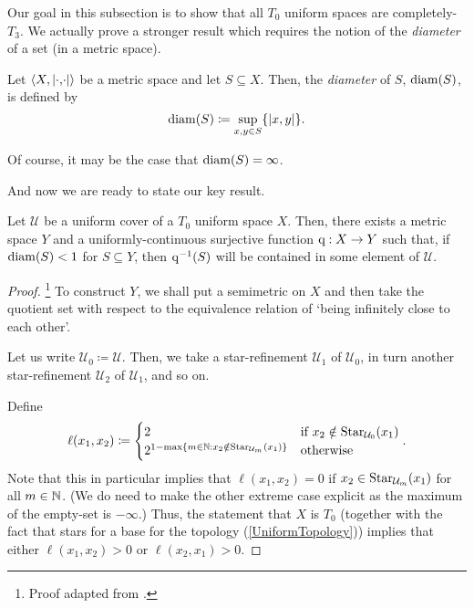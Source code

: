 Our goal in this subsection is to show that all $T_0$ uniform spaces are completely-$T_3$.  We actually prove a stronger result which requires the notion of the \emph{diameter} of a set (in a metric space).
\begin{dfn}[Diameter]\label{Diameter}
Let $\coord{X,\metric}$ be a metric space and let $S\subseteq X$.  Then, the \emph{diameter} of $S$, $\operatorname{diam} (S)$, is defined by
\begin{equation}
\diam (S)\coloneqq \sup _{x,y\in S}\{ \metric[x][y]\} .
\end{equation}
\begin{rmk}
Of course, it may be the case that $\operatorname{diam} (S)=\infty$.
\end{rmk}
\end{dfn}
And now we are ready to state our key result.
\begin{thm}
\begin{savenotes}
Let $\mathcal{U}$ be a uniform cover of a $T_0$ uniform space $X$.  Then, there exists a metric space $Y$ and a uniformly-continuous surjective function $\mathrm{q} :X\rightarrow Y$ such that, if $\operatorname{diam} (S)<1$ for $S\subseteq Y$, then $\mathrm{q} ^{-1}(S)$ will be contained in some element of $\mathcal{U}$.
\begin{proof}\footnote{Proof adapted from \cite[pg.~8]{Isbell}.}
To construct $Y$, we shall put a semimetric on $X$ and then take the quotient set with respect to the equivalence relation of `being infinitely close to each other'.

Let us write $\mathcal{U}_0\coloneqq \mathcal{U}$.  Then, we take a star-refinement $\mathcal{U}_1$ of $\mathcal{U}_0$, in turn another star-refinement $\mathcal{U}_2$ of $\mathcal{U}_1$, and so on.

\label{stp4.8.76.2}
Define
\begin{equation}
\ell (x_1,x_2)\coloneqq \begin{cases}2 & \text{if }x_2\notin \operatorname{Star} _{\mathcal{U}_0}(x_1) \\ 2^{1-\max \{ m\in \mathbb{N} :x_2\notin \operatorname{Star} _{\mathcal{U}_m}(x_1)\}} & \text{otherwise}\end{cases}.
\end{equation}
Note that this in particular implies that $\ell (x_1,x_2)=0$ if $x_2\in \operatorname{Star} _{\mathcal{U}_m}(x_1)$ for all $m\in \mathbb{N}$.  (We do need to make the other extreme case explicit as the maximum of the empty-set is $-\infty$.)  Thus, the statement that $X$ is $T_0$ (together with the fact that stars for a base for the topology (\cref{UniformTopology})) implies that either $\ell (x_1,x_2)>0$ or $\ell (x_2,x_1)>0$.


\end{proof}
\end{savenotes}
\end{thm}
